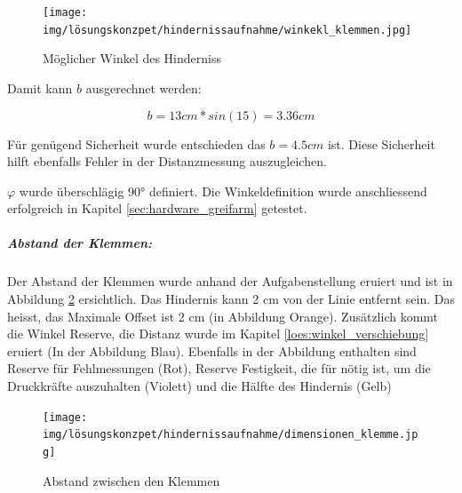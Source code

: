 \documentclass[../main.tex]{subfiles}
\begin{document}
\begin{figure}[H]
        \centering
        \texttt{[image: img/lösungskonzpet/hindernissaufnahme/winkekl\_klemmen.jpg]}
        \caption {Möglicher Winkel des Hinderniss}
        \label{img:loes_winkel_hinderniss}
\end{figure}

Damit kann $b$ ausgerechnet werden:

\[
b = 13cm * sin(15) = 3.36cm
\]

Für genügend Sicherheit wurde entschieden das $b = 4.5cm$ ist. Diese Sicherheit hilft ebenfalls Fehler in der Distanzmessung auszugleichen.

$\varphi$ wurde überschlägig 90° definiert. Die Winkeldefinition wurde anschliessend erfolgreich in Kapitel \ref{sec:hardware_greifarm} getestet.

\newpage

\subparagraph{Abstand der Klemmen:} \label{loes:abstand_klemmen}
Der Abstand der Klemmen wurde anhand der Aufgabenstellung eruiert und ist in Abbildung \ref{img:loes_abstand_klemmen} ersichtlich. Das Hindernis kann 2 cm von der Linie entfernt sein. Das heisst, das Maximale Offset ist 2 cm (in Abbildung Orange). Zusätzlich kommt die Winkel Reserve, die Distanz wurde im Kapitel \ref{loes:winkel_verschiebung} eruiert (In der Abbildung Blau). Ebenfalls in der Abbildung enthalten sind Reserve für Fehlmessungen (Rot), Reserve Festigkeit, die für nötig ist, um die Druckkräfte auszuhalten (Violett) und die Hälfte des Hindernis (Gelb)

\begin{figure}[H]
        \centering
        \texttt{[image: img/lösungskonzpet/hindernissaufnahme/dimensionen\_klemme.jpg]}
        \caption {Abstand zwischen den Klemmen}
        \label{img:loes_abstand_klemmen}
\end{figure}
\end{document}

